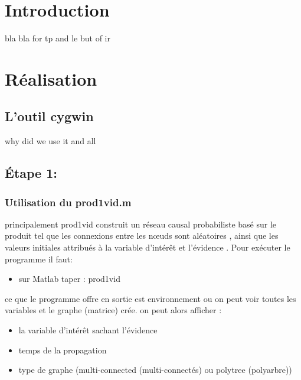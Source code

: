 \documentclass[12pt,a4paper,oneside]{book}
\begin{document}
	\tableofcontents

	\listoffigures

	
	\chapter{Introduction }
	bla bla for tp and le but of ir
	\chapter{Réalisation}
	\section{L'outil cygwin}
	  why did we use it and all
	\section{Étape 1:}
	\subsection{Utilisation du prod1vid.m}
	 principalement prod1vid construit un réseau causal probabiliste basé sur le produit tel que les connexions entre les nœuds sont aléatoires , ainsi que les valeurs initiales attribués à la variable d'intérêt et l'évidence .
	 Pour exécuter le programme il faut:
	 \begin{itemize}
	 	\item sur Matlab taper : prod1vid
	 	
	 \end{itemize}
	 ce que le programme offre en sortie est environnement ou on peut voir toutes les variables et le graphe (matrice) crée.
	 on peut alors afficher :
	 
	 \begin{itemize}
	 	\item la variable d'intérêt sachant l'évidence
	 	\item temps de la propagation
	 	\item type de graphe (multi-connected (multi-connectés) ou polytree (polyarbre))
	 \end{itemize}
\end{document}
